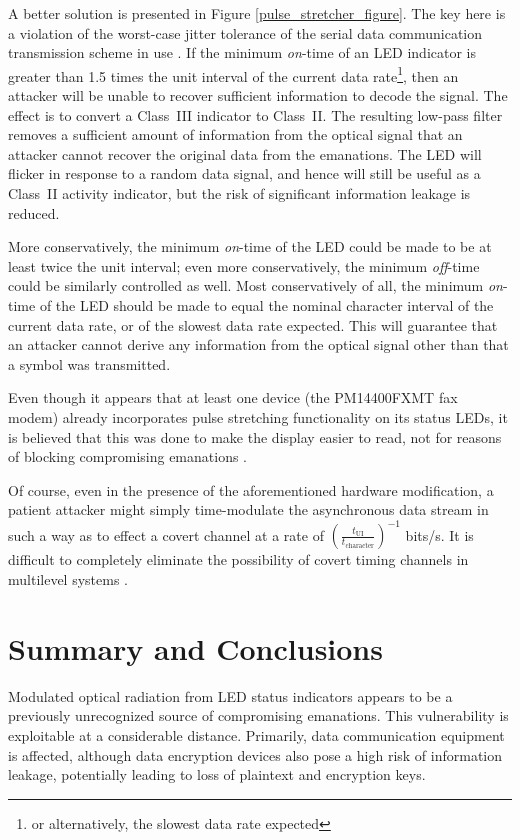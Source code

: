 \documentclass{acmtrans2e}
\begin{document}
A better solution is presented in Figure \ref{pulse_stretcher_figure}.  
The key here is a violation of the worst-case jitter tolerance of the
serial data communication transmission scheme in use \cite{tia_eia_404_b}.
If the minimum {\it on}-time of an LED indicator is 
greater than 1.5 times the unit interval of the current data 
rate\footnote{or alternatively, the slowest data rate expected}, then
an attacker will be unable to recover sufficient information to decode 
the signal.  The effect is to convert a Class~III indicator to Class~II.
The resulting low-pass filter removes a sufficient amount of information from
the optical signal that an attacker cannot recover the original data
from the emanations.  The LED will flicker in response to a random data
signal, and hence will still be useful as a Class~II activity indicator,
but the risk of significant information leakage is reduced.

More conservatively, the minimum
{\it on}-time of the LED could be made to be at least twice the unit interval;
even more conservatively, the minimum {\it off}-time could be similarly
controlled as well.  Most conservatively of all, the minimum {\it on}-time
of the LED should be made to equal the nominal character interval of
the current data rate, or of the slowest data rate expected.  This
will guarantee that an attacker cannot derive any information
from the optical signal other than that a symbol was transmitted.

Even though it appears that at least one device (the PM14400FXMT fax modem)
already incorporates pulse stretching functionality on its status LEDs, it is
believed that this was done to make the display easier to read, not for
reasons of blocking compromising emanations \cite{pulse_stretcher}.

Of course, even in the presence of the aforementioned hardware modification,
a patient attacker might simply time-modulate the asynchronous data stream
in such a way as to effect a covert channel at a rate of
${(\frac{t_\mathrm{UI}}{t_\mathrm{character}})}^{-1}$ bits/s.
It is difficult to completely
eliminate the possibility of covert timing channels in multilevel systems
\cite{pgn_covert_channels_paper}.

\section{Summary and Conclusions}

Modulated optical radiation from LED status indicators appears to be a 
previously unrecognized source of compromising emanations.  This 
vulnerability is exploitable at a considerable distance.  Primarily, data 
communication equipment is affected, although data encryption devices 
also pose a high risk of information leakage, potentially leading to loss of 
plaintext and encryption keys.
\end{document}
